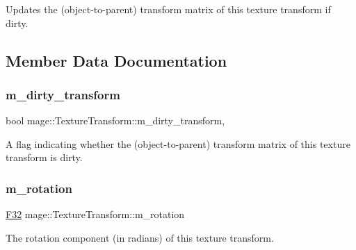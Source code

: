 Updates the (object-\/to-\/parent) transform matrix of this texture transform if dirty. 

\subsection{Member Data Documentation}
\hypertarget{classmage_1_1_texture_transform_a7d23cd89e4ab16e08a214272d280c5e2}{}\label{classmage_1_1_texture_transform_a7d23cd89e4ab16e08a214272d280c5e2} 
\subsubsection{\texorpdfstring{m\+\_\+dirty\+\_\+transform}{m\_dirty\_transform}}
{\footnotesize\ttfamily bool mage\+::\+Texture\+Transform\+::m\+\_\+dirty\+\_\+transform\hspace{0.3cm}{\ttfamily [mutable]}, {\ttfamily [private]}}

A flag indicating whether the (object-\/to-\/parent) transform matrix of this texture transform is dirty. \hypertarget{classmage_1_1_texture_transform_aa9b56aac4354fa7f37caee42451f60d1}{}\label{classmage_1_1_texture_transform_aa9b56aac4354fa7f37caee42451f60d1} 
\subsubsection{\texorpdfstring{m\+\_\+rotation}{m\_rotation}}
{\footnotesize\ttfamily \hyperlink{namespacemage_aa97e833b45f06d60a0a9c4fc22ae02c0}{F32} mage\+::\+Texture\+Transform\+::m\+\_\+rotation\hspace{0.3cm}{\ttfamily [private]}}

The rotation component (in radians) of this texture transform. \hypertarget{classmage_1_1_texture_transform_a6be18aac7ead059bb2ea4b3a464e0272}{}\label{classmage_1_1_texture_transform_a6be18aac7ead059bb2ea4b3a464e0272} 
